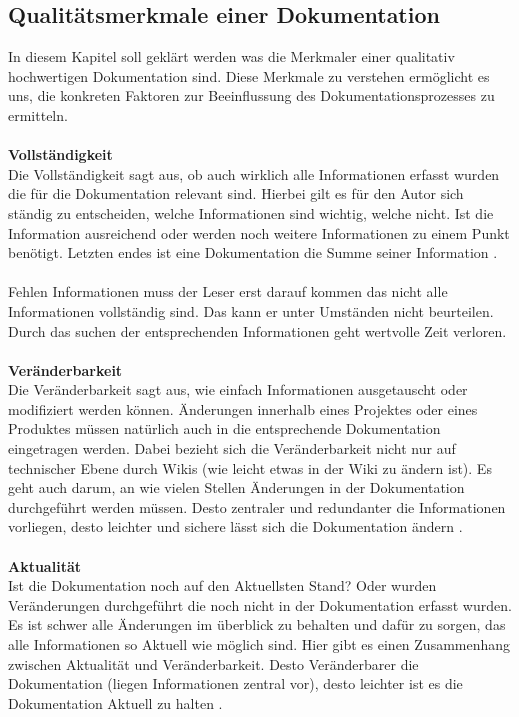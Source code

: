 \documentclass[a4paper,12pt]{scrartcl}
\begin{document}
\subsection{Qualitätsmerkmale einer Dokumentation}
In diesem Kapitel soll geklärt werden was die Merkmaler einer qualitativ hochwertigen Dokumentation sind. Diese Merkmale zu verstehen ermöglicht es uns, die konkreten Faktoren zur Beeinflussung des Dokumentationsprozesses zu ermitteln.
\\\\
\textbf{Vollständigkeit}\\
Die Vollständigkeit sagt aus, ob auch wirklich alle Informationen erfasst wurden die für die Dokumentation relevant sind. Hierbei gilt es für den Autor sich ständig zu entscheiden, welche Informationen sind wichtig, welche nicht. Ist die Information ausreichend oder werden noch weitere Informationen zu einem Punkt benötigt. Letzten endes ist eine Dokumentation die Summe seiner Information \cite{Prause2013}.
\\\\
Fehlen Informationen muss der Leser erst darauf kommen das nicht alle Informationen vollständig sind. Das kann er unter Umständen nicht beurteilen. Durch das suchen der entsprechenden Informationen geht wertvolle Zeit verloren.
\\\\
\textbf{Veränderbarkeit}\\
Die Veränderbarkeit sagt aus, wie einfach Informationen ausgetauscht oder modifiziert werden können. Änderungen innerhalb eines Projektes oder eines Produktes müssen natürlich auch in die entsprechende Dokumentation eingetragen werden. Dabei bezieht sich die Veränderbarkeit nicht nur auf technischer Ebene durch Wikis (wie leicht etwas in der Wiki zu ändern ist). Es geht auch darum, an wie vielen Stellen Änderungen in der Dokumentation durchgeführt werden müssen. Desto zentraler und redundanter die Informationen vorliegen, desto leichter und sichere lässt sich die Dokumentation ändern \cite{Prause2013}.
\\\\
\textbf{Aktualität}\\
Ist die Dokumentation noch auf den Aktuellsten Stand? Oder wurden Veränderungen durchgeführt die noch nicht in der Dokumentation erfasst wurden. Es ist schwer alle Änderungen im überblick zu behalten und dafür zu sorgen, das alle Informationen so Aktuell wie möglich sind. Hier gibt es einen Zusammenhang zwischen Aktualität und Veränderbarkeit. Desto Veränderbarer die Dokumentation (liegen Informationen zentral vor), desto leichter ist es die Dokumentation Aktuell zu halten \cite{Prause2013}.
\end{document}
